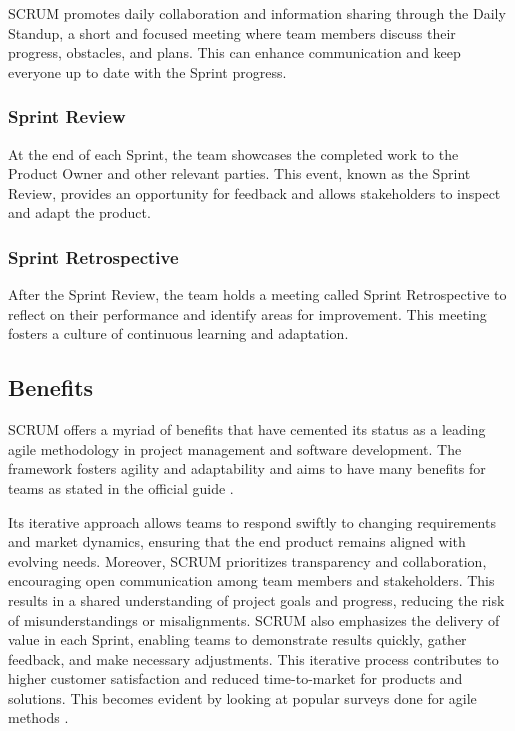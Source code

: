 SCRUM promotes daily collaboration and information sharing through the Daily Standup, 
a short and focused meeting where team members discuss their progress,
obstacles, and plans. 
This can enhance communication and keep everyone up to
date with the Sprint progress.

\subsubsection*{Sprint Review}

At the end of each Sprint, the team showcases the completed work to the
Product Owner and other relevant parties.
This event, known as the Sprint Review, provides an
opportunity for feedback and allows stakeholders to
inspect and adapt the product.

\subsubsection*{Sprint Retrospective}

After the Sprint Review, the team holds a meeting called Sprint
Retrospective to reflect on their performance and identify
areas for improvement. 
This meeting fosters a culture of continuous learning and adaptation.  

\subsection{Benefits}

SCRUM offers a myriad of benefits that have cemented its status as a
leading agile methodology in project management and software development.
The framework fosters agility and adaptability and 
aims to have many benefits for teams as stated in the official guide \parencite{TheScrumGuide}. 

Its iterative approach allows teams to respond swiftly to changing requirements
and market dynamics, ensuring that the end product remains aligned with evolving needs.
Moreover, SCRUM prioritizes transparency and collaboration,
encouraging open communication among team members and stakeholders.
This results in a shared understanding of project goals and progress, 
reducing the risk of misunderstandings or misalignments. 
SCRUM also emphasizes the delivery of value in each Sprint,
enabling teams to demonstrate results quickly, gather feedback,
and make necessary adjustments. This iterative process contributes to higher 
customer satisfaction and reduced time-to-market for products and solutions. 
This becomes evident by looking at popular surveys done for agile methods \parencite{AgileTransformationSurvey} \parencite{StateOfAgile2023}.

